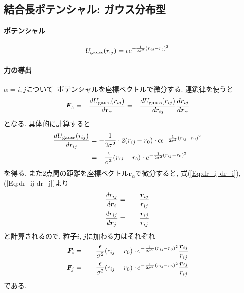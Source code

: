\subsection{結合長ポテンシャル: ガウス分布型}
\paragraph{ポテンシャル}
\begin{equation}
   U_{\mathrm{gauss}} (r_{ij})
   =
   \epsilon
   e^{-\frac{1}{2\sigma^{2}}(r_{ij} - r_{0})^{2}}
   \notag
\end{equation}

\paragraph{力の導出}
$\alpha = i, j$について, ポテンシャルを座標ベクトルで微分する. 連鎖律を使うと
\begin{equation}
   \bm{F}_{\alpha}
   =
   -
   \frac{d U_{\mathrm{gauss}}(r_{ij})}{d \bm{r}_{\alpha}}
   =
   -
   \frac{d U_{\mathrm{gauss}}(r_{ij})}{d r_{ij}}
   \frac{d r_{ij}}{d \bm{r}_{\alpha}}
   \notag
\end{equation}
となる. 具体的に計算すると
\begin{align}
   \frac{d U_{\mathrm{gauss}}(r_{ij})}{d r_{ij}}
   &=
   -
   \frac{1}{2\sigma^{2}}
   \cdot 2
   (r_{ij} - r_{0})
   \cdot
   \epsilon
   e^{-\frac{1}{2\sigma^{2}}(r_{ij} - r_{0})^{2}}
   \notag
   \\
   &=
   -
   \frac{\epsilon}{\sigma^{2}}
   (r_{ij} - r_{0})
   \cdot
   e^{-\frac{1}{2\sigma^{2}}(r_{ij} - r_{0})^{2}}
   \notag
\end{align}
を得る. また2点間の距離を座標ベクトル$\bm{r}_{\alpha}$で微分すると, 式(\ref{Eq:dr_ij-dr_i}), (\ref{Eq:dr_ij-dr_j})より
\begin{alignat}{3}
   \frac{d r_{ij}}{d \bm{r}_{i}}
   &=
   -&&
   \frac{\bm{r}_{ij}}{r_{ij}}
   \notag
   \\
   \frac{d r_{ij}}{d \bm{r}_{j}}
   &=&&
   \frac{\bm{r}_{ij}}{r_{ij}}
   \notag
\end{alignat}
と計算されるので, 粒子$i$, $j$に加わる力はそれぞれ
\begin{alignat}{3}
   \bm{F}_{i}
   &=
   -&&
   \frac{\epsilon}{\sigma^{2}}
   (r_{ij} - r_{0})
   \cdot
   e^{-\frac{1}{2\sigma^{2}}(r_{ij} - r_{0})^{2}}
   \frac{\bm{r}_{ij}}{r_{ij}}
   \notag \\
   \bm{F}_{j}
   &=&&
   \frac{\epsilon}{\sigma^{2}}
   (r_{ij} - r_{0})
   \cdot
   e^{-\frac{1}{2\sigma^{2}}(r_{ij} - r_{0})^{2}}
   \frac{\bm{r}_{ij}}{r_{ij}}
   \notag
\end{alignat}
である.

